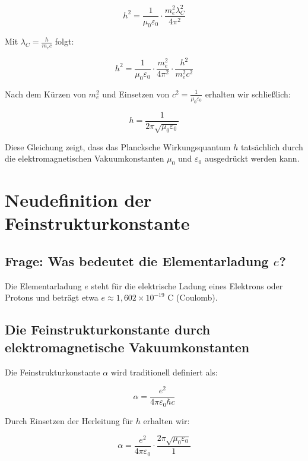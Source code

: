 \documentclass{article}
\begin{document}
\begin{equation}
	h^2 = \frac{1}{\mu_0\varepsilon_0} \cdot \frac{m_e^2 \lambda_C^2}{4\pi^2}
\end{equation}

Mit $\lambda_C = \frac{h}{m_e c}$ folgt:

\begin{equation}
	h^2 = \frac{1}{\mu_0\varepsilon_0} \cdot \frac{m_e^2}{4\pi^2} \cdot \frac{h^2}{m_e^2c^2}
\end{equation}

Nach dem Kürzen von $m_e^2$ und Einsetzen von $c^2 = \frac{1}{\mu_0\varepsilon_0}$ erhalten wir schließlich:

\begin{equation}
	h = \frac{1}{2\pi\sqrt{\mu_0\varepsilon_0}}
\end{equation}

Diese Gleichung zeigt, dass das Plancksche Wirkungsquantum $h$ tatsächlich durch die elektromagnetischen Vakuumkonstanten $\mu_0$ und $\varepsilon_0$ ausgedrückt werden kann.

\section{Neudefinition der Feinstrukturkonstante}

\subsection{Frage: Was bedeutet die Elementarladung $e$?}

Die Elementarladung $e$ steht für die elektrische Ladung eines Elektrons oder Protons und beträgt etwa $e \approx 1,602 \times 10^{-19}$ C (Coulomb).

\subsection{Die Feinstrukturkonstante durch elektromagnetische Vakuumkonstanten}

Die Feinstrukturkonstante $\alpha$ wird traditionell definiert als:

\begin{equation}
	\alpha = \frac{e^2}{4\pi\varepsilon_0\hbar c}
\end{equation}

Durch Einsetzen der Herleitung für $h$ erhalten wir:

\begin{equation}
	\alpha = \frac{e^2}{4\pi\varepsilon_0} \cdot \frac{2\pi\sqrt{\mu_0\varepsilon_0}}{1}
\end{equation}
\end{document}
